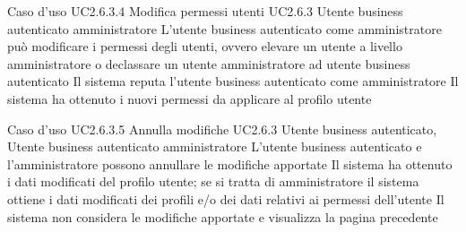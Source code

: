 \UCtitle
{Caso d'uso UC2.6.3.4}
{Modifica permessi utenti}
\UC
{UC2.6.3}
{Utente business autenticato amministratore}
{L'utente business autenticato come amministratore può modificare i permessi degli utenti, ovvero elevare un utente a livello amministratore o declassare un utente amministratore ad utente business autenticato}
{Il sistema reputa l'utente business autenticato come amministratore}
\post
{Il sistema ha ottenuto i nuovi permessi da applicare al profilo utente}


\UCtitle
{Caso d'uso UC2.6.3.5}
{Annulla modifiche}
\UC
{UC2.6.3}
{Utente business autenticato, Utente business autenticato amministratore}
{L'utente business autenticato e l'amministratore possono annullare le modifiche apportate}
{Il sistema ha ottenuto i dati modificati del profilo utente; se si tratta di amministratore il sistema ottiene i dati modificati dei profili e/o dei dati relativi ai permessi dell'utente}
\post
{Il sistema non considera le modifiche apportate e visualizza la pagina precedente}








